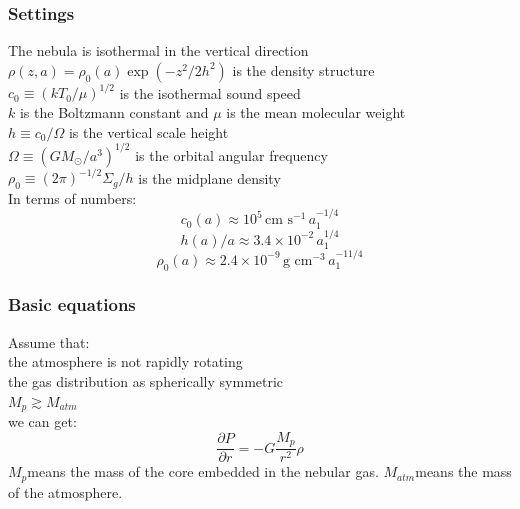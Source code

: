 \documentclass{beamer}
\begin{document}
\begin{frame}
\frametitle{Settings}
The nebula is isothermal in the vertical direction\\ 
$\rho(z,a) = \rho_0(a) \exp(-z^2/2h^2)$ is the density structure\\ 
$c_0 \equiv (kT_0/\mu)^{1/2}$ is the isothermal sound speed\\ 
$k$ is the Boltzmann constant and $\mu$ is the mean molecular weight\\ 
$h \equiv c_0/\Omega$ is the vertical scale height\\ 
$\Omega \equiv (GM_\odot/a^3)^{1/2}$ is the orbital angular frequency\\ 
$\rho_0 \equiv (2\pi)^{-1/2}\Sigma_g/h$ is the midplane density\\
In terms of numbers:
\begin{equation}
c_0(a) \approx 10^5 \, \text{cm s}^{-1} \, a_1^{-1/4}
\end{equation}
\begin{equation}
h(a)/a \approx 3.4 \times 10^{-2} \, a_1^{1/4}
\end{equation}
\begin{equation}
\rho_0(a) \approx 2.4 \times 10^{-9} \, \text{g cm}^{-3} \, a_1^{-11/4}
\end{equation}
\end{frame}

\begin{frame}
\frametitle{Basic equations}
Assume that:\\
the atmosphere is not rapidly rotating\\
the gas distribution as spherically symmetric\\
$M_p \gtrsim M_{atm}$\\
we can get:
\begin{equation}
\frac{\partial P}{\partial r} =  -G\frac{M_p}{r^2}\rho
\end{equation}
$M_p$means the mass of the core embedded in the nebular gas.
$M_{atm}$means the mass of the atmosphere.
\end{frame}
\end{document}
